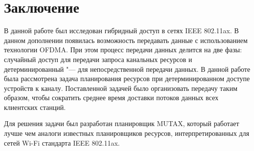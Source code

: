 \section*{Заключение}

В данной работе был исследован гибридный доступ в сетях IEEE 802.11ax. В данном дополнении появилась возможность передавать данные с использованием технологии OFDMA. 
При этом процесс передачи данных делится на две фазы: случайный доступ для передачи запроса канальных ресурсов и детерминированный "--- для непосредственной передачи данных. 
В данной работе была рассмотрена задача планирования ресурсов при детерминированном доступе устройств к каналу.  
Поставленной задачей было организовать передачу таким образом, чтобы сократить среднее время доставки потоков данных всех клиентских станций. 

Для решения задачи был разработан планировщик MUTAX, который работает лучше чем аналоги известных планировщиков ресурсов, интерпретированных для сетей Wi-Fi стандарта IEEE 802.11ax.

